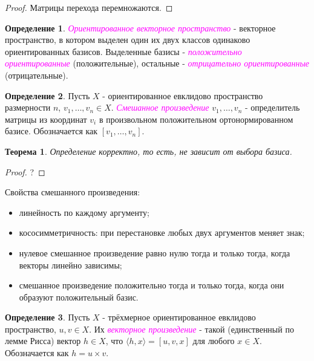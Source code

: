 \documentclass[a4paper,100pt]{article}
\theoremstyle{indented}
\newtheorem{theorem}{Теорема}
\theoremstyle{definition}
\newtheorem{defn}{Определение}
\theoremstyle{remark}
\begin{document}
\begin{proof}
    Матрицы перехода перемножаются.
\end{proof}

\begin{defn}
    \textit{\textcolor{magenta}{\hypertarget{s79}{Ориентированное векторное пространство}}} - векторное пространство, в котором выделен один их двух классов одинаково ориентированных базисов. Выделенные базисы - \textit{\textcolor{magenta}{\hypertarget{s80}{положительно ориентированные}}} (положительные), остальные - \textit{\textcolor{magenta}{\hypertarget{s81}{отрицательно ориентированные}}} (отрицательные).
\end{defn}

\begin{defn}
    Пусть $X$ - ориентированное евклидово пространство размерности $n$, $v_1, \ldots, v_n \in X$. \textit{\textcolor{magenta}{\hypertarget{s82}{Смешанное произведение}}} $v_1, \ldots, v_n$ - определитель матрицы из координат $v_i$ в произвольном положительном ортонормированном базисе. Обозначается как $[v_1, \ldots, v_n]$. 
\end{defn}

\begin{theorem}
    Определение корректно, то есть, не зависит от выбора базиса.
\end{theorem}

\begin{proof}
    ?
\end{proof}

Свойства смешанного произведения:

\begin{itemize}
    \item линейность по каждому аргументу; 
    \item кососимметричность: при перестановке любых двух аргументов меняет знак;
    \item нулевое смешанное произведение равно нулю тогда и только тогда, когда векторы линейно зависимы; 
    \item смешанное произведение положительно тогда и только тогда, когда они образуют положительный базис.
\end{itemize}

\begin{defn}
    Пусть $X$ - трёхмерное ориентированное евклидово пространство, $u, v\in X$. Их \textit{\textcolor{magenta}{\hypertarget{s83}{векторное произведение}}} - такой (единственный по лемме Рисса) вектор $h\in X$, что $\langle h, x\rangle = [u, v, x]$ для любого $x\in X$. Обозначается как $h=u\times v$. 
\end{defn}
\end{document}
